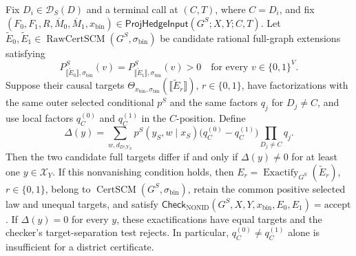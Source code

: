 Fix \(D_i\in\mathcal D_S(D)\) and a terminal call at \((C,T)\), where \(C=D_i\), and fix \((F_0,F_1,R,\overline M_0,\overline M_1,x_{\mathrm{bin}})\in\mathsf{ProjHedgeInput}(G^S;X,Y;C,T)\). Let \(\widetilde E_0,\widetilde E_1\in\operatorname{RawCertSCM}(G^S,\sigma_{\mathrm{bin}})\) be candidate rational full-graph extensions satisfying
\[
 P_{\llbracket\widetilde E_0\rrbracket,\sigma_{\mathrm{bin}}}^S(v)
 =P_{\llbracket\widetilde E_1\rrbracket,\sigma_{\mathrm{bin}}}^S(v)>0
 \quad\text{for every }v\in\{0,1\}^{V}.
\]
Suppose their causal targets \(\Theta_{x_{\mathrm{bin}},\sigma_{\mathrm{bin}}}(\llbracket\widetilde E_r\rrbracket)\), \(r\in\{0,1\}\), have factorizations with the same outer selected conditional \(p^S\) and the same factors \(q_j\) for \(D_j\ne C\), and use local factors \(q_C^{(0)}\) and \(q_C^{(1)}\) in the \(C\)-position. Define
\[
 \Delta(y)=\sum_{w,d_{D\setminus Y_N}}
 p^S(y_S,w\mid x_S)
 \bigl(q_C^{(0)}-q_C^{(1)}\bigr)
 \prod_{D_j\ne C}q_j.
\]
Then the two candidate full targets differ if and only if \(\Delta(y)\ne0\) for at least one \(y\in\mathcal X_Y\). If this nonvanishing condition holds, then \(E_r=\operatorname{Exactify}_{G^S}(\widetilde E_r)\), \(r\in\{0,1\}\), belong to \(\operatorname{CertSCM}(G^S,\sigma_{\mathrm{bin}})\), retain the common positive selected law and unequal targets, and satisfy \(\mathsf{Check}_{\mathrm{NONID}}(G^S,X,Y,x_{\mathrm{bin}},E_0,E_1)=\mathrm{accept}\). If \(\Delta(y)=0\) for every \(y\), these exactifications have equal targets and the checker's target-separation test rejects. In particular, \(q_C^{(0)}\ne q_C^{(1)}\) alone is insufficient for a district certificate.